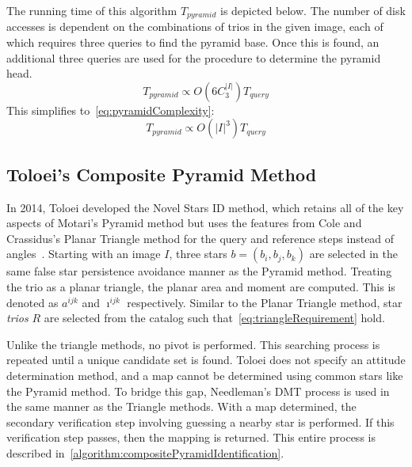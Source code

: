The running time of this algorithm $T_{pyramid}$ is depicted below.
The number of disk accesses is dependent on the combinations of trios in the given image, each of which requires
three queries to find the pyramid base.
Once this is found, an additional three queries are used for the  procedure to determine the
pyramid head.
\begin{equation}\label{eq:pyramidComplexityPart1}
    T_{pyramid} \propto O\left( 6 C^{|I|}_{3} \right) T_{query}
\end{equation}
This simplifies to~\autoref{eq:pyramidComplexity}:
\begin{equation}\label{eq:pyramidComplexity}
    T_{pyramid} \propto O\left( |I|^3 \right) T_{query}
\end{equation}

\subsection{Toloei's Composite Pyramid Method}\label{subsec:toloei'sCompositePyramidMethod}
In 2014, Toloei developed the Novel Stars ID method, which retains all of the key aspects of Motari's
Pyramid method but uses the features from Cole and Crassidus's Planar Triangle method for the query and reference steps
instead of angles~\cite{Composite}.
Starting with an image $I$, three stars $b = (b_i, b_j, b_k)$ are selected in the same false star persistence avoidance
manner as the Pyramid method.
Treating the trio as a planar triangle, the planar area and moment are computed.
This is denoted as $a^{ijk}$ and $\imath^{ijk}$ respectively.
Similar to the Planar Triangle method, star \textit{trios} $R$ are selected from the catalog such
that~\autoref{eq:triangleRequirement} hold.

Unlike the triangle methods, no pivot is performed.
This searching process is repeated until a unique candidate set is found.
Toloei does not specify an attitude determination method, and a map cannot be determined using common
stars like the Pyramid method.
To bridge this gap, Needleman's DMT process is used in the same manner as the Triangle methods.
With a map determined, the secondary verification step involving guessing a nearby star is performed.
If this verification step passes, then the mapping is returned.
This entire process is described in~\autoref{algorithm:compositePyramidIdentification}.

